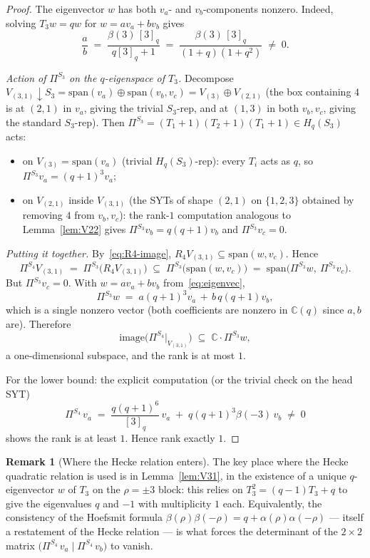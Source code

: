 \documentclass[11pt]{article}
\theoremstyle{definition}
\newtheorem{remark}[theorem]{Remark}
\newcommand{\Pis}[1]{\Pi^{S_{#1}}}
\newcommand{\Hq}[1]{H_q(S_{#1})}
\begin{document}
\begin{proof}
The eigenvector $w$ has both $v_a$- and $v_b$-components nonzero. Indeed,
solving $T_3 w = q w$ for $w = a v_a + b v_b$ gives
\begin{equation}\label{eq:eigenvec}
\frac{a}{b} \;=\; \frac{\beta(3)\,[3]_q}{q[3]_q + 1}
       \;=\; \frac{\beta(3)\,[3]_q}{(1+q)(1+q^2)}
       \;\neq\; 0.
\end{equation}

\emph{Action of $\Pis{3}$ on the $q$-eigenspace of $T_3$.}
Decompose $V_{(3,1)}{\downarrow}S_3 = \mathrm{span}(v_a) \oplus \mathrm{span}(v_b, v_c)
= V_{(3)} \oplus V_{(2,1)}$ (the box containing $4$ is at $(2,1)$ in $v_a$,
giving the trivial $S_3$-rep, and at $(1,3)$ in both $v_b, v_c$, giving
the standard $S_3$-rep). Then $\Pis{3} = (T_1+1)(T_2+1)(T_1+1) \in \Hq{3}$
acts:
\begin{itemize}[leftmargin=2em,topsep=0.2em,itemsep=0.05em]
\item on $V_{(3)} = \mathrm{span}(v_a)$ (trivial $\Hq{3}$-rep): every $T_i$
  acts as $q$, so $\Pis{3} v_a = (q+1)^3 v_a$;
\item on $V_{(2,1)}$ inside $V_{(3,1)}$ (the SYTs of shape $(2,1)$ on
  $\{1,2,3\}$ obtained by removing $4$ from $v_b, v_c$): the rank-$1$
  computation analogous to Lemma~\ref{lem:V22} gives
  $\Pis{3} v_b = q(q+1) v_b$ and $\Pis{3} v_c = 0$.
\end{itemize}

\emph{Putting it together.} By~\eqref{eq:R4-image},
$R_4 V_{(3,1)} \subseteq \mathrm{span}(w, v_c)$. Hence
\[
\Pis{4} V_{(3,1)} \;=\; \Pis{3}\bigl(R_4 V_{(3,1)}\bigr)
  \;\subseteq\; \Pis{3}\bigl(\mathrm{span}(w, v_c)\bigr)
  \;=\; \mathrm{span}\bigl(\Pis{3} w,\ \Pis{3} v_c\bigr).
\]
But $\Pis{3} v_c = 0$. With $w = a v_a + b v_b$ from~\eqref{eq:eigenvec},
\[
\Pis{3} w \;=\; a (q+1)^3 v_a \,+\, b\, q(q+1) v_b,
\]
which is a single nonzero vector (both coefficients are nonzero in
$\mathbb{C}(q)$ since $a, b$ are). Therefore
\[
\mathrm{image}\bigl(\Pis{4}\big|_{V_{(3,1)}}\bigr)
  \;\subseteq\; \mathbb{C}\cdot \Pis{3} w,
\]
a one-dimensional subspace, and the rank is at most $1$.

For the lower bound: the explicit computation (or the trivial check on
the head SYT)
\[
\Pis{4}\, v_a \;=\; \frac{q(q+1)^6}{[3]_q}\, v_a
  \;+\; q(q+1)^3 \beta(-3)\, v_b \;\neq\; 0
\]
shows the rank is at least $1$. Hence rank exactly $1$. \qedhere
\end{proof}

\begin{remark}[Where the Hecke relation enters]
The key place where the Hecke quadratic relation is used is in
Lemma~\ref{lem:V31}, in the existence of a unique $q$-eigenvector $w$
of $T_3$ on the $\rho=\pm 3$ block: this relies on $T_3^2 = (q-1)T_3 + q$
to give the eigenvalues $q$ and $-1$ with multiplicity $1$ each.
Equivalently, the consistency of the Hoefsmit formula
$\beta(\rho)\beta(-\rho) = q + \alpha(\rho)\alpha(-\rho)$ — itself a
restatement of the Hecke relation — is what forces the determinant of
the $2\times 2$ matrix
$\bigl(\Pis{4}\, v_a \mid \Pis{4}\, v_b\bigr)$ to vanish.
\end{remark}
\end{document}
